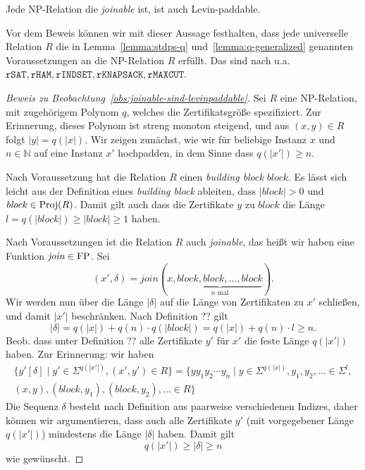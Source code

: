 \begin{observation}\label{obs:joinable-sind-levinpaddable}
    Jede NP-Relation die \emph{joinable} ist, ist auch Levin-paddable.
\end{observation}
Vor dem Beweis können wir mit dieser Aussage festhalten, dass jede universelle Relation $R$ die in 
Lemma~\ref{lemma:stdps-q} und~\ref{lemma:q-generalized} genannten Voraussetzungen an die NP-Relation $R$ erfüllt.
Das sind nach \textcite{agrawal_universal_1992} u.a. $\mathtt{rSAT}, \mathtt{rHAM}, \mathtt{rINDSET}, \mathtt{rKNAPSACK}, \mathtt{rMAXCUT}$.
\begin{proof}[Beweis zu Beobachtung~\ref{obs:joinable-sind-levinpaddable}]
     Sei $R$ eine NP-Relation, mit zugehörigem Polynom $q$, welches die Zertifikatsgröße spezifiziert. Zur Erinnerung, dieses Polynom ist streng monoton steigend, und aus $(x,y)\in R$ folgt $|y|=q(|x|)$.
    Wir zeigen zunächst, wie wir für beliebige Instanz $x$ und $n\in\mathbb N$ auf eine Instanz $x'$ hochpadden, in dem Sinne dass $q(|x'|) \geq n$.

    Nach Voraussetzung hat  die Relation $R$ einen \emph{building block} $\mathit{block}$. Es lässt sich leicht aus der Definition eines \emph{building block} ableiten, dass $|\mathit{block}|>0$ und $\mathit{block}\in\operatorname{Proj}(R)$. Damit gilt auch dass die Zertifikate $y$ zu $\mathit{block}$ die Länge $l=q(|\mathit{block}|)\geq |\mathit{block}|\geq 1$ haben.

    Nach Voraussetzungen  ist die Relation $R$ auch \emph{joinable}, das heißt wir haben eine Funktion $\mathit{join}\in\mathrm{FP}$. Sei 
    \[ (x',\delta)=\mathit{join}(x, \underbrace{\mathit{block}, \mathit{block}, \ldots, \mathit{block}}_{\text{$n$ mal}}).\]
    Wir werden nun über die Länge $|\delta|$ auf die Länge von Zertifikaten zu $x'$ schließen, und damit $|x'|$ beschränken.
    Nach Definition ?? gilt
    \[ |\delta|=q(|x|)+q(n)\cdot q(|\mathit{block}|)=q(|x|)+q(n)\cdot l\geq n. \]
    Beob. dass unter Definition ?? alle Zertifikate $y'$ für $x'$ die feste Länge $q(|x'|)$ haben. 
    Zur Erinnerung: wir haben
    \begin{multline}\label{eq:levinpad-join} \{ y'[\delta] \mid y'\in\Sigma^{q(|x'|)}, (x', y')\in R \} = \{ yy_1y_2\cdots y_{n} \mid y\in\Sigma^{q(|x|)}, y_1,y_2, \ldots \in \Sigma^{l},\\ (x,y),(\mathit{block}, y_1),(\mathit{block}, y_2), \ldots \in R\} \end{multline}
    Die Sequenz $\delta$ besteht nach Definition aus paarweise verschiedenen Indizes, daher können wir argumentieren, dass auch alle Zertifikate $y'$ (mit vorgegebener Länge $q(|x'|)$) mindestens die Länge $|\delta|$ haben.
    Damit gilt
    \[ q(|x'|) \geq |\delta| \geq n \]
    wie gewünscht.


\end{proof}
